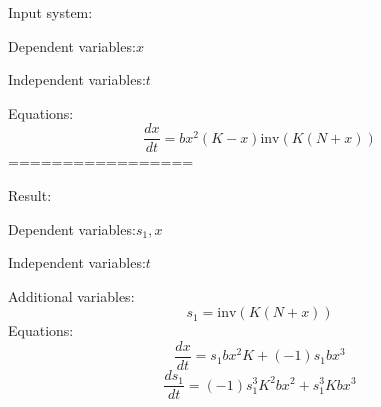 \documentclass[10pt,a4paper]{article}
\begin{document}
Input system:

Dependent variables:$x$

Independent variables:$t$

Equations:
\begin{dmath*}\frac{dx}{dt} = b  x ^ {2}  \left(K - x\right)  \text{inv}\left(K  \left(N + x\right)\right)\end{dmath*}
=================

Result:

Dependent variables:$s_{1}, x$

Independent variables:$t$

Additional variables:
\begin{dmath*}s_{1} = \text{inv}\left(K  \left(N + x\right)\right)\end{dmath*}
Equations:
\begin{dmath*}\frac{dx}{dt} = s_{1}  b  x ^ {2}  K + \left(-1\right)  s_{1}  b  x ^ {3}\end{dmath*}
\begin{dmath*}\frac{ds_{1}}{dt} = \left(-1\right)  s_{1} ^ {3}  K ^ {2}  b  x ^ {2} + s_{1} ^ {3}  K  b  x ^ {3}\end{dmath*}
\end{document}
